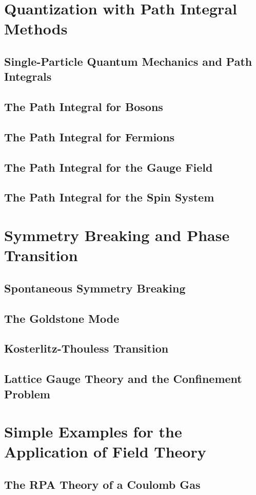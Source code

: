 \documentclass[twoside,11pt]{report}
\begin{document}
\chapter{Quantization with Path Integral Methods}
\section{Single-Particle Quantum Mechanics and Path Integrals}
\section{The Path Integral for Bosons}
\section{The Path Integral for Fermions}
\section{The Path Integral for the Gauge Field}
\section{The Path Integral for the Spin System}
\chapter{Symmetry Breaking and Phase Transition}
\section{Spontaneous Symmetry Breaking}
\section{The Goldstone Mode}
\section{Kosterlitz-Thouless Transition}
\section{Lattice Gauge Theory and the Confinement Problem}
\chapter{Simple Examples for the Application of Field Theory}
\section{The RPA Theory of a Coulomb Gas}
\end{document}
